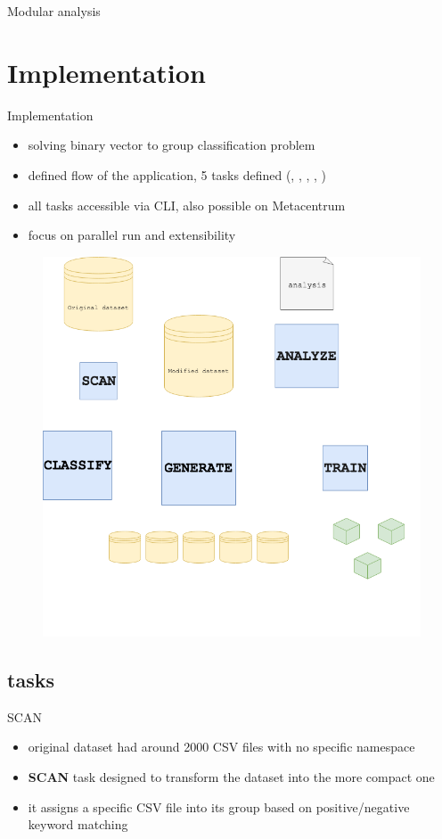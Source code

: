 \documentclass{beamer}
\newcommand\Fontsmall{\fontsize{8}{7.2}\selectfont}
\begin{document}
\begin{darkframes}
\begin{frame}{Modular analysis}
    \end{frame}

    \section{Implementation}
    \begin{frame}{Implementation}
      \begin{itemize}
        \Fontsmall
        \item solving binary vector to group classification problem
        \item defined flow of the application, 5 tasks defined ({}, {}, {}, {}, {})
        \item all tasks accessible via CLI, also possible on Metacentrum
        \item focus on parallel run and extensibility        
      \end{itemize}
      \begin{figure}[H]
        \centering
        \includegraphics[width=0.5\linewidth]{../tex/images/thesis_model_img}
      \end{figure}     
    \end{frame}

    \subsection{tasks}
    \begin{frame}{SCAN}
      \begin{itemize}
        \item original dataset had around 2000 CSV files with no specific namespace
        \item \textbf{SCAN} task designed to transform the dataset into the more compact one
        \item it assigns a specific CSV file into its group based on positive/negative keyword matching
      \end{itemize}
    \end{frame}


\end{darkframes}
\end{document}
